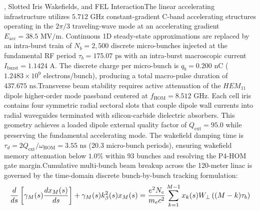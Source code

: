 \begin{sloppypar}
, Slotted Iris Wakefields, and FEL InteractionThe linear accelerating infrastructure utilizes $5.712\text{ GHz}$ constant-gradient C-band accelerating structures operating in the $2\pi/3$ traveling-wave mode at an accelerating gradient $E_{\text{acc}} = 38.5\text{ MV/m}$. Continuous 1D steady-state approximations are replaced by an intra-burst train of $N_b = 2,500$ discrete micro-bunches injected at the fundamental RF period $\tau_b = 175.07\text{ ps}$ with an intra-burst macroscopic current $I_{\text{burst}} = 1.1424\text{ A}$. The discrete charge per micro-bunch is $q_b = 0.200\text{ nC}$ ($1.2483 \times 10^9$ electrons/bunch), producing a total macro-pulse duration of $437.675\text{ ns}$.Transverse beam stability requires active attenuation of the $HEM_{11}$ dipole higher-order mode passband centered at $f_{\text{HOM}} = 8.512\text{ GHz}$. Each cell iris contains four symmetric radial sectoral slots that couple dipole wall currents into radial waveguides terminated with silicon-carbide dielectric absorbers. This geometry achieves a loaded dipole external quality factor of $Q_{\text{ext}} = 95.0$ while preserving the fundamental accelerating mode. The wakefield damping time is $\tau_d = 2Q_{\text{ext}}/\omega_{\text{HOM}} = 3.55\text{ ns}$ ($20.3$ micro-bunch periods), ensuring wakefield memory attenuation below $1.0\%$ within 93 bunches and resolving the P4-HOM gate margin.Cumulative multi-bunch beam breakup across the 120-meter linac is governed by the time-domain discrete bunch-by-bunch tracking formulation:\[
\resizebox{\columnwidth}{!}{$\displaystyle \frac{d}{ds} \left[ \gamma_M(s) \frac{d x_M(s)}{ds} \right] + \gamma_M(s) k_\beta^2(s) x_M(s) = \frac{e^2 N_e}{m_e c^2} \sum_{k=1}^{M-1} x_k(s) W_\perp\left((M - k)\tau_b\right)$}
\]

\end{sloppypar}
